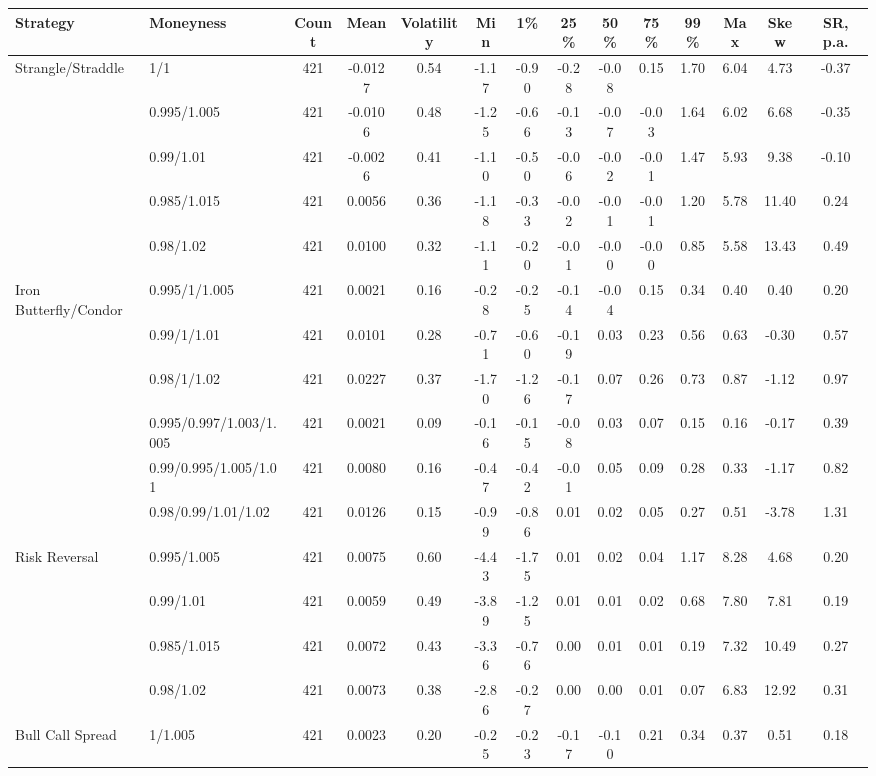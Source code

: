 \begin{tabular}{llcccccccccccc}
\toprule
Strategy & Moneyness & Count & Mean & Volatility & Min & 1\% & 25\% & 50\% & 75\% & 99\% & Max & Skew & SR, p.a. \\
\midrule
Strangle/Straddle & 1/1 & 421 & -0.0127 & 0.54 & -1.17 & -0.90 & -0.28 & -0.08 & 0.15 & 1.70 & 6.04 & 4.73 & -0.37 \\
 & 0.995/1.005 & 421 & -0.0106 & 0.48 & -1.25 & -0.66 & -0.13 & -0.07 & -0.03 & 1.64 & 6.02 & 6.68 & -0.35 \\
 & 0.99/1.01 & 421 & -0.0026 & 0.41 & -1.10 & -0.50 & -0.06 & -0.02 & -0.01 & 1.47 & 5.93 & 9.38 & -0.10 \\
 & 0.985/1.015 & 421 & 0.0056 & 0.36 & -1.18 & -0.33 & -0.02 & -0.01 & -0.01 & 1.20 & 5.78 & 11.40 & 0.24 \\
 & 0.98/1.02 & 421 & 0.0100 & 0.32 & -1.11 & -0.20 & -0.01 & -0.00 & -0.00 & 0.85 & 5.58 & 13.43 & 0.49 \\
Iron Butterfly/Condor & 0.995/1/1.005 & 421 & 0.0021 & 0.16 & -0.28 & -0.25 & -0.14 & -0.04 & 0.15 & 0.34 & 0.40 & 0.40 & 0.20 \\
 & 0.99/1/1.01 & 421 & 0.0101 & 0.28 & -0.71 & -0.60 & -0.19 & 0.03 & 0.23 & 0.56 & 0.63 & -0.30 & 0.57 \\
 & 0.98/1/1.02 & 421 & 0.0227 & 0.37 & -1.70 & -1.26 & -0.17 & 0.07 & 0.26 & 0.73 & 0.87 & -1.12 & 0.97 \\
 & 0.995/0.997/1.003/1.005 & 421 & 0.0021 & 0.09 & -0.16 & -0.15 & -0.08 & 0.03 & 0.07 & 0.15 & 0.16 & -0.17 & 0.39 \\
 & 0.99/0.995/1.005/1.01 & 421 & 0.0080 & 0.16 & -0.47 & -0.42 & -0.01 & 0.05 & 0.09 & 0.28 & 0.33 & -1.17 & 0.82 \\
 & 0.98/0.99/1.01/1.02 & 421 & 0.0126 & 0.15 & -0.99 & -0.86 & 0.01 & 0.02 & 0.05 & 0.27 & 0.51 & -3.78 & 1.31 \\
Risk Reversal & 0.995/1.005 & 421 & 0.0075 & 0.60 & -4.43 & -1.75 & 0.01 & 0.02 & 0.04 & 1.17 & 8.28 & 4.68 & 0.20 \\
 & 0.99/1.01 & 421 & 0.0059 & 0.49 & -3.89 & -1.25 & 0.01 & 0.01 & 0.02 & 0.68 & 7.80 & 7.81 & 0.19 \\
 & 0.985/1.015 & 421 & 0.0072 & 0.43 & -3.36 & -0.76 & 0.00 & 0.01 & 0.01 & 0.19 & 7.32 & 10.49 & 0.27 \\
 & 0.98/1.02 & 421 & 0.0073 & 0.38 & -2.86 & -0.27 & 0.00 & 0.00 & 0.01 & 0.07 & 6.83 & 12.92 & 0.31 \\
Bull Call Spread & 1/1.005 & 421 & 0.0023 & 0.20 & -0.25 & -0.23 & -0.17 & -0.10 & 0.21 & 0.34 & 0.37 & 0.51 & 0.18 \\

\end{tabular}
